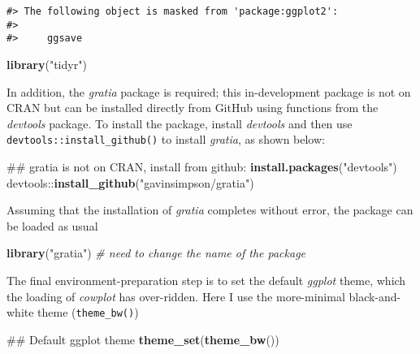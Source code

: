 \documentclass[12pt,]{article}
\newenvironment{Shaded}{\begin{snugshade}}{\end{snugshade}}
\newcommand{\KeywordTok}[1]{\textcolor[rgb]{0.13,0.29,0.53}{\textbf{{#1}}}}
\newcommand{\StringTok}[1]{\textcolor[rgb]{0.31,0.60,0.02}{{#1}}}
\newcommand{\CommentTok}[1]{\textcolor[rgb]{0.56,0.35,0.01}{\textit{{#1}}}}
\newcommand{\NormalTok}[1]{{#1}}
\begin{document}
\begin{verbatim}
#> The following object is masked from 'package:ggplot2':
#> 
#>     ggsave
\end{verbatim}

\begin{Shaded}
\begin{Highlighting}[]
\KeywordTok{library}\NormalTok{(}\StringTok{"tidyr"}\NormalTok{)}
\end{Highlighting}
\end{Shaded}

In addition, the \emph{gratia} package is required; this in-development
package is not on CRAN but can be installed directly from GitHub using
functions from the \emph{devtools} package. To install the package,
install \emph{devtools} and then use
\texttt{devtools::install\_github()} to install \emph{gratia}, as shown
below:

\begin{Shaded}
\begin{Highlighting}[]
\NormalTok{## gratia is not on CRAN, install from github:}
\KeywordTok{install.packages}\NormalTok{(}\StringTok{"devtools"}\NormalTok{)}
\NormalTok{devtools::}\KeywordTok{install_github}\NormalTok{(}\StringTok{"gavinsimpson/gratia"}\NormalTok{)}
\end{Highlighting}
\end{Shaded}

Assuming that the installation of \emph{gratia} completes without error,
the package can be loaded as usual

\begin{Shaded}
\begin{Highlighting}[]
\KeywordTok{library}\NormalTok{(}\StringTok{"gratia"}\NormalTok{) }\CommentTok{# need to change the name of the package}
\end{Highlighting}
\end{Shaded}

The final environment-preparation step is to set the default
\emph{ggplot} theme, which the loading of \emph{cowplot} has
over-ridden. Here I use the more-minimal black-and-white theme
(\texttt{theme\_bw()})

\begin{Shaded}
\begin{Highlighting}[]
\NormalTok{## Default ggplot theme}
\KeywordTok{theme_set}\NormalTok{(}\KeywordTok{theme_bw}\NormalTok{())}
\end{Highlighting}
\end{Shaded}
\end{document}
